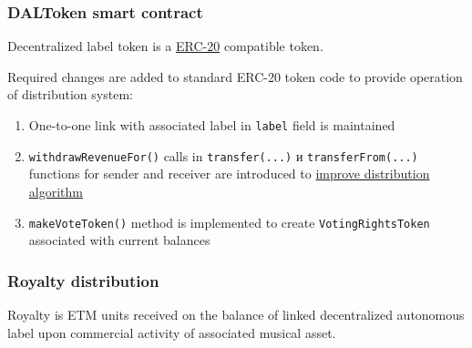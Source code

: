 \documentclass[12pt]{report}
\def\code#1{\colorbox{light-gray}{\texttt{#1}}}
\begin{document}
\subsubsection{DALToken smart contract}
\label{tech-apps-dal-token}
Decentralized label token is a \hyperref[tech-blockchain-contracts]{ERC-20} compatible token.

Required changes are added to standard ERC-20 token code to provide operation of distribution system:
\begin{enumerate}
	\item One-to-one link with associated label in \code{label} field is maintained
	\item \code{withdrawRevenueFor()} calls in \code{transfer(...)} и \code{transferFrom(...)} functions for sender and receiver are introduced to \hyperref[tech-apps-dal-royalty-optimization]{improve distribution algorithm}
	\item \code{makeVoteToken()} method is implemented to create \code{VotingRightsToken} associated with current balances
\end{enumerate}
\subsubsection{Royalty distribution}
\label{tech-apps-dal-royalty}
Royalty is ETM units received on the balance of linked decentralized autonomous label upon commercial activity of associated musical asset.
\end{document}
